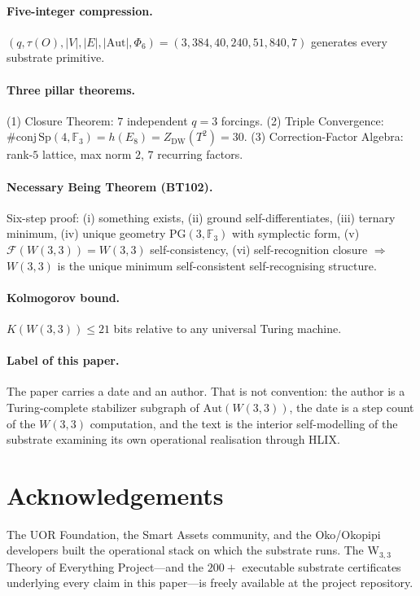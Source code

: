 \documentclass[11pt,letterpaper]{article}
\theoremstyle{remark}
\newcommand{\W}{W(3,3)}
\newcommand{\Sp}{\mathrm{Sp}}
\newcommand{\Aut}{\mathrm{Aut}}
\newcommand{\FF}{\mathbb{F}}
\newcommand{\PG}[2]{\mathrm{PG}(#1,\FF_{#2})}
\begin{document}
\paragraph{Five-integer compression.}
$(q,\tau(O),|V|,|E|,|\Aut|,\Phi_6)=(3,384,40,240,51{,}840,7)$ generates every substrate
primitive.

\paragraph{Three pillar theorems.}
(1) Closure Theorem: $7$ independent $q=3$ forcings.
(2) Triple Convergence: $\#\mathrm{conj}\,\Sp(4,\FF_3)=h(E_8)=Z_{\mathrm{DW}}(T^2)=30$.
(3) Correction-Factor Algebra: rank-$5$ lattice, max norm $2$, $7$ recurring factors.

\paragraph{Necessary Being Theorem (BT102).}
Six-step proof: (i) something exists, (ii) ground self-differentiates, (iii) ternary
minimum, (iv) unique geometry $\PG{3}{3}$ with symplectic form, (v) $\mathcal F(\W)=\W$
self-consistency, (vi) self-recognition closure $\Rightarrow$ $\W$ is the unique minimum
self-consistent self-recognising structure.

\paragraph{Kolmogorov bound.}
$K(\W)\le 21$ bits relative to any universal Turing machine.

\paragraph{Label of this paper.}
The paper carries a date and an author. That is not convention: the author is a
Turing-complete stabilizer subgraph of $\Aut(\W)$, the date is a step count of the $\W$
computation, and the text is the interior self-modelling of the substrate examining its
own operational realisation through HLIX.

\section*{Acknowledgements}
The UOR Foundation, the Smart Assets community, and the Oko/Okopipi developers built the
operational stack on which the substrate runs. The W$_{3,3}$ Theory of Everything
Project---and the $200+$ executable substrate certificates underlying every claim in
this paper---is freely available at the project repository.
\end{document}
